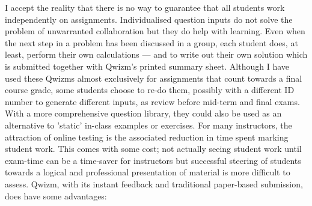 \documentclass{tufte-handout}
\begin{document}
I accept the reality that there is no way to guarantee that all students work independently on assignments. Individualised question inputs do not solve the problem of unwarranted collaboration but they do help with learning. Even when the next step in a problem has been discussed in a group, each student does, at least, perform their own calculations --- and to write out their own solution which is submitted together with Qwizm's printed summary sheet.
\parm
Although I have used these Qwizms almost exclusively for assignments that count towards a final course grade, some students choose to re-do them, possibly with a different ID number to generate different inputs, as review before mid-term and final exams. With a more comprehensive question library, they could also be used as an alternative to 'static' in-class examples or exercises.
\parm
For many instructors, the attraction of online testing is the associated reduction in time spent marking student work. This comes with some cost; not actually seeing student work until exam-time can be a time-saver for instructors but successful steering of students towards a logical and professional presentation of material is more difficult to assess.
\parm
Qwizm, with its instant feedback and traditional paper-based submission, does have some advantages:
\end{document}
